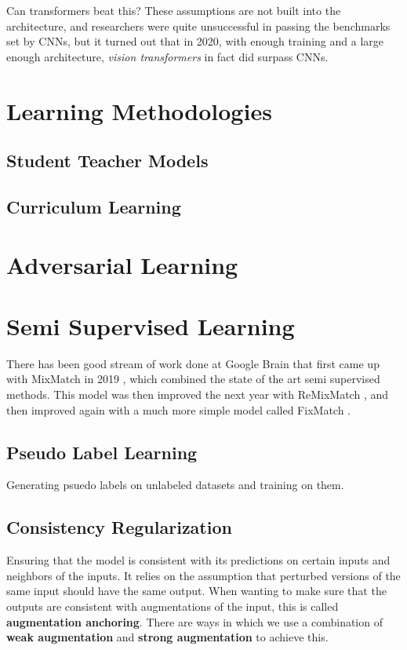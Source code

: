 \documentclass{article}
\begin{document}
    Can transformers beat this? These assumptions are not built into the architecture, and researchers were quite unsuccessful in passing the benchmarks set by CNNs, but it turned out that in 2020, with enough training and a large enough architecture, \textit{vision transformers} in fact did surpass CNNs. 

\section{Learning Methodologies} 

  \subsection{Student Teacher Models} 

  \subsection{Curriculum Learning} 

\section{Adversarial Learning}

\section{Semi Supervised Learning} 

There has been good stream of work done at Google Brain that first came up with MixMatch in 2019 \cite{berthelot2019mixmatch}, which combined the state of the art semi supervised methods. This model was then improved the next year with ReMixMatch \cite{berthelot2020remixmatch}, and then improved again with a much more simple model called FixMatch \cite{sohn2020fixmatch}. 

  \subsection{Pseudo Label Learning} 
    
    Generating psuedo labels on unlabeled datasets and training on them. 

  \subsection{Consistency Regularization}
    
    Ensuring that the model is consistent with its predictions on certain inputs and neighbors of the inputs. It relies on the assumption that perturbed versions of the same input should have the same output. When wanting to make sure that the outputs are consistent with augmentations of the input, this is called \textbf{augmentation anchoring}. There are ways in which we use a combination of \textbf{weak augmentation} and \textbf{strong augmentation} to achieve this. 
\end{document}

